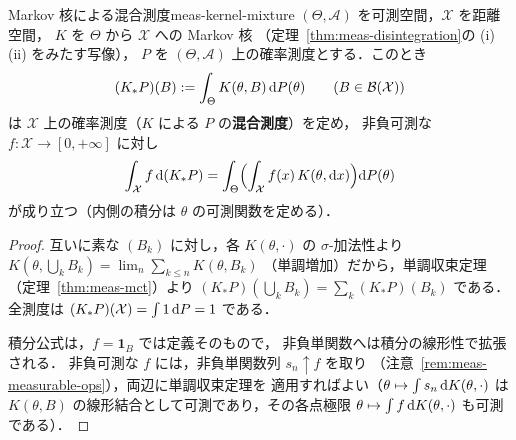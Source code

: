 \begin{claim}{Markov 核による混合測度}{meas-kernel-mixture}
  $(\Theta,\mathcal{A})$ を可測空間，$\mathcal{X}$ を距離空間，
  $K$ を $\Theta$ から $\mathcal{X}$ への Markov 核
  （定理~\ref{thm:meas-disintegration}の (i)(ii) をみたす写像），
  $P$ を $(\Theta,\mathcal{A})$ 上の確率測度とする．このとき
  \[
    (K_*P)(B):=\int_\Theta K(\theta,B)\,\mathrm{d} P(\theta)
    \qquad(B\in\mathcal{B}(\mathcal{X}))
  \]
  は $\mathcal{X}$ 上の確率測度（$K$ による $P$ の\textbf{混合測度}）を定め，
  非負可測な $f\colon\mathcal{X}\to[0,+\infty]$ に対し
  \[
    \int_{\mathcal{X}}f\,\mathrm{d}(K_*P)
    =\int_\Theta\Bigl(\int_{\mathcal{X}}f(x)\,K(\theta,\mathrm{d} x)\Bigr)\mathrm{d} P(\theta)
  \]
  が成り立つ（内側の積分は $\theta$ の可測関数を定める）．
\end{claim}

\begin{proof}
  互いに素な $(B_k)$ に対し，各 $K(\theta,\cdot)$ の
  $\sigma$-加法性より
  $K(\theta,\bigcup_kB_k)=\lim_n\sum_{k\leq n}K(\theta,B_k)$
  （単調増加）だから，単調収束定理（定理~\ref{thm:meas-mct}）より
  $(K_*P)(\bigcup_kB_k)=\sum_k(K_*P)(B_k)$ である．
  全測度は $(K_*P)(\mathcal{X})=\int1\,\mathrm{d} P=1$ である．

  積分公式は，$f=\mathbf{1}_B$ では定義そのもので，
  非負単関数へは積分の線形性で拡張される．
  非負可測な $f$ には，非負単関数列 $s_n\uparrow f$ を取り
  （注意~\ref{rem:meas-measurable-ops}），両辺に単調収束定理を
  適用すればよい（$\theta\mapsto\int s_n\,\mathrm{d} K(\theta,\cdot)$ は
  $K(\theta,B)$ の線形結合として可測であり，その各点極限
  $\theta\mapsto\int f\,\mathrm{d} K(\theta,\cdot)$ も可測である）．
\end{proof}
